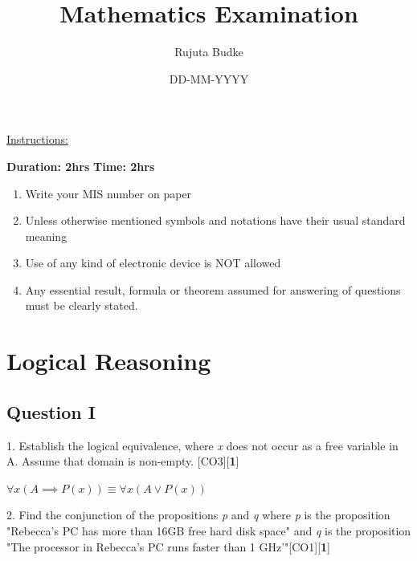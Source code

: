\documentclass[a4paper]{article}
\begin{document}
  
\title{Mathematics Examination}
\date{DD-MM-YYYY}
\author{Rujuta Budke}
\maketitle

\newpage
\tableofcontents
\newpage

\begin{Large}
\underline{Instructions:}\\
\end{Large}


\noindent \textbf{Duration: 2hrs} \hfill \textbf{Time: 2hrs}
\begin{enumerate}
\item Write your MIS number on paper 
\item Unless otherwise mentioned symbols and notations have their usual standard meaning
\item Use of any kind of electronic device is NOT allowed
\item Any essential result, formula or theorem assumed for answering of questions must be clearly stated.
\end{enumerate}



\pagebreak

\section{Logical Reasoning}

\subsection*{Question I}
1. Establish the logical equivalence, where \textit{x} does not occur as a free variable in A. Assume that domain is non-empty. \hfill [CO3][{\bf 1}]
\begin{center}
$ \forall x (A \implies P(x))\equiv \forall x (A \lor P(x))$
\end{center}

2. Find the conjunction of the propositions \textit{p} and \textit{q} where \textit{p} is the proposition "Rebecca's PC has more than 16GB free hard disk space" and \textit{q} is the proposition "The processor in Rebecca's PC runs faster than 1 GHz'"\hfill [CO1][{\bf 1}]
\end{document}
